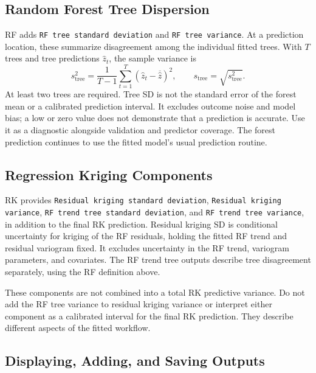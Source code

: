 \documentclass[11pt,a4paper]{article}
\begin{document}
\subsection{Random Forest Tree Dispersion}
\label{sec:uncertainty-rf}

RF adds \texttt{RF tree standard deviation} and \texttt{RF tree variance}. At a prediction location, these summarize disagreement among the individual fitted trees. With $T$ trees and tree predictions $\hat z_t$, the sample variance is
\[
    s^2_{\mathrm{tree}}=\frac{1}{T-1}\sum_{t=1}^{T}
        (\hat z_t-\overline{\hat z})^2,
    \qquad s_{\mathrm{tree}}=\sqrt{s^2_{\mathrm{tree}}}.
\]
At least two trees are required. Tree SD is not the standard error of the forest mean or a calibrated prediction interval. It excludes outcome noise and model bias; a low or zero value does not demonstrate that a prediction is accurate. Use it as a diagnostic alongside validation and predictor coverage. The forest prediction continues to use the fitted model's usual prediction routine.

\subsection{Regression Kriging Components}
\label{sec:uncertainty-rk}

RK provides \texttt{Residual kriging standard deviation}, \texttt{Residual kriging variance}, \texttt{RF trend tree standard deviation}, and \texttt{RF trend tree variance}, in addition to the final RK prediction. Residual kriging SD is conditional uncertainty for kriging of the RF residuals, holding the fitted RF trend and residual variogram fixed. It excludes uncertainty in the RF trend, variogram parameters, and covariates. The RF trend tree outputs describe tree disagreement separately, using the RF definition above.

These components are not combined into a total RK predictive variance. Do not add the RF tree variance to residual kriging variance or interpret either component as a calibrated interval for the final RK prediction. They describe different aspects of the fitted workflow.

\clearpage
\subsection{Displaying, Adding, and Saving Outputs}
\end{document}
